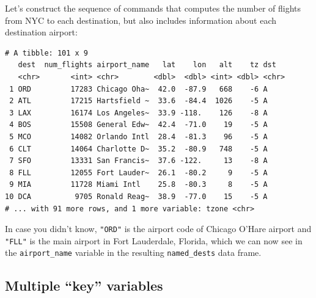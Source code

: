 \documentclass[12pt, krantz2,]{krantz}
\makeatletter
\newenvironment{Shaded}{\begin{snugshade}}{\end{snugshade}}
\newcommand{\DataTypeTok}[1]{\textcolor[rgb]{0.27,0.27,0.27}{#1}}
\newcommand{\KeywordTok}[1]{\textcolor[rgb]{0.27,0.27,0.27}{\textbf{#1}}}
\newcommand{\NormalTok}[1]{#1}
\newcommand{\OperatorTok}[1]{\textcolor[rgb]{0.43,0.43,0.43}{\textbf{#1}}}
\newcommand{\StringTok}[1]{\textcolor[rgb]{0.5,0.5,0.5}{#1}}
\newenvironment{kframe}{%
\medskip{}
\setlength{\fboxsep}{.8em}
 \def\at@end@of@kframe{}%
 \ifinner\ifhmode%
  \def\at@end@of@kframe{\end{minipage}}%
  \begin{minipage}{\columnwidth}%
 \fi\fi%
 \def\FrameCommand##1{\hskip\@totalleftmargin \hskip-\fboxsep
 \colorbox{shadecolor}{##1}\hskip-\fboxsep
     \hskip-\linewidth \hskip-\@totalleftmargin \hskip\columnwidth}%
 \MakeFramed {\advance\hsize-\width
   \@totalleftmargin\z@ \linewidth\hsize
   \@setminipage}}%
 {\par\unskip\endMakeFramed%
 \at@end@of@kframe}
\renewenvironment{Shaded}{\begin{kframe}}{\end{kframe}}
\makeatother
\begin{document}
Let's construct the sequence of commands that computes the number of flights from NYC to each destination, but also includes information about each destination airport:

\begin{Shaded}
\end{Shaded}

\begin{verbatim}
# A tibble: 101 x 9
   dest  num_flights airport_name   lat    lon   alt    tz dst  
   <chr>       <int> <chr>        <dbl>  <dbl> <int> <dbl> <chr>
 1 ORD         17283 Chicago Oha~  42.0  -87.9   668    -6 A    
 2 ATL         17215 Hartsfield ~  33.6  -84.4  1026    -5 A    
 3 LAX         16174 Los Angeles~  33.9 -118.    126    -8 A    
 4 BOS         15508 General Edw~  42.4  -71.0    19    -5 A    
 5 MCO         14082 Orlando Intl  28.4  -81.3    96    -5 A    
 6 CLT         14064 Charlotte D~  35.2  -80.9   748    -5 A    
 7 SFO         13331 San Francis~  37.6 -122.     13    -8 A    
 8 FLL         12055 Fort Lauder~  26.1  -80.2     9    -5 A    
 9 MIA         11728 Miami Intl    25.8  -80.3     8    -5 A    
10 DCA          9705 Ronald Reag~  38.9  -77.0    15    -5 A    
# ... with 91 more rows, and 1 more variable: tzone <chr>
\end{verbatim}

In case you didn't know, \texttt{"ORD"} is the airport code of Chicago O'Hare airport and \texttt{"FLL"} is the main airport in Fort Lauderdale, Florida, which we can now see in the \texttt{airport\_name} variable in the resulting \texttt{named\_dests} data frame.

\hypertarget{multiple-key-variables}{%
\subsection{Multiple ``key'' variables}\label{multiple-key-variables}}
\end{document}
